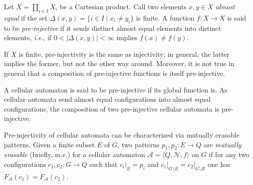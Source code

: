 \documentclass[12pt]{article}
\begin{document}
\newcommand{\Acal}{\ensuremath{\mathcal{A}}}
\newcommand{\goe}{\mathbb{GoE}}
\newcommand{\ie}{\textit{i.e.}}
\newcommand{\Neigh}{\ensuremath{\mathcal{N}}}
\newcommand{\restrict}[2]{\ensuremath{\left.{#1}\right|_{#2}}}

\newtheorem{lemma}{Lemma}

Let $X = \prod_{i \in I} X_i$ be a Cartesian product.
Call two elements $x,y \in X$ \emph{almost equal}
if the set $\Delta(x,y) = \{i \in I \mid x_i \neq y_i\}$ is finite.
A function $f : X \to X$ is said to be \emph{pre-injective}
if it sends distinct almost equal elements into distinct elements,
\ie, if $0 < |\Delta(x,y)| < \infty$ implies $f(x) \not= f(y)$.

If $X$ is finite, pre-injectivity is the same as injectivity;
in general, the latter implies the former, but not the other way around.
Moreover, it is not true in general
that a composition of pre-injective functions
is itself pre-injective.

A cellular automaton is said to be pre-injective if its global function is.
As cellular automata send almost equal configurations
into almost equal configurations,
the composition of two pre-injective cellular automata is pre-injective.

Pre-injectivity of cellular automata can be characterized
via mutually erasable patterns.
Given a finite subset $E$ of $G$,
two patterns
\begin{math}
p_1,p_2 : E \to Q
\end{math}
are \emph{mutually erasable} (briefly, m.e.)
for a cellular automaton
\begin{math}
\Acal = \langle Q, \Neigh, f \rangle
\end{math}
on $G$
if for any two configurations
\begin{math}
c_1,c_2 : G \to Q
\end{math}
such that
\begin{math}
\restrict{c_i}{E} = p_i
\end{math}
and
\begin{math}
\restrict{c_1}{G \setminus E} = \restrict{c_2}{G \setminus E}
\end{math}
one has $F_\Acal(c_1) = F_\Acal(c_2)$.
\end{document}
